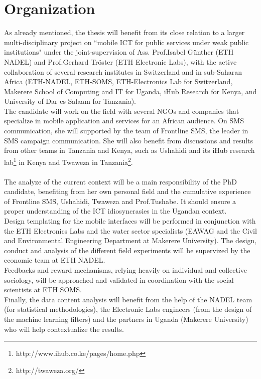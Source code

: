 \documentclass[11pt]{article}
\begin{document}
\section{Organization}\label{organization}
As already mentioned, the thesis will benefit from its close relation to a larger multi-disciplinary project on ``mobile ICT for public services under weak public institutions" under the joint-supervision of Ass. Prof.Isabel G\"{u}nther (ETH NADEL) and Prof.Gerhard Tr\"{o}ster (ETH Electronic Labs), with the active collaboration of several research institutes in Switzerland and in sub-Saharan Africa (ETH-­NADEL, ETH-­SOMS, ETH-­Electronics Lab for Switzerland, Makerere School of Computing and IT for Uganda, iHub Research for Kenya, and University of Dar es Salaam for Tanzania).  
\\
The candidate will work on the field with several NGOs and companies that specialize in mobile application and services for an African audience. On SMS communication, she will supported by the team of Frontline SMS, the leader in SMS campaign communication. She will also benefit from discussions and results from other teams in Tanzania and Kenya, such as Ushahidi and its iHub research lab\footnote{http://www.ihub.co.ke/pages/home.php} in Kenya and Twaweza in Tanzania\footnote{http://twaweza.org/}.
\\\\
The analyze of the current context will be a main responsibility of the PhD candidate, benefiting from her own personal field and the cumulative experience of Frontline SMS, Ushahidi, Twaweza and Prof.Tushabe. It should ensure a proper understanding of the ICT idiosyncrasies in the Ugandan context.
\\
Design templating for the mobile interfaces will be performed in conjunction with the ETH Electronics Labs and the water sector specialists (EAWAG and the Civil and Environmental Engineering Department at Makerere University). The design, conduct and analysis of the different field experiments will be supervized by the economic team at ETH NADEL.
\\
Feedbacks and reward mechanisms, relying heavily on individual and collective sociology, will be approached and validated in coordination with the social scientists at ETH SOMS.
\\
Finally, the data content analysis will benefit from the help of the NADEL team (for statistical methodologies), the Electronic Labs engineers (from the design of the machine learning filters) and the partners in Uganda (Makerere University) who will help contextualize the results.    
\end{document}
